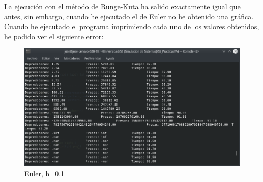 \documentclass[11pt,a4paper]{article}
\begin{document}
La ejecución con el método de Runge-Kuta ha salido exactamente igual que antes, sin embargo, cuando he ejecutado el de Euler no he obtenido una gráfica.
Cuando he ejecutado el programa imprimiendo cada uno de los valores obtenidos, he podido ver el siguiente error:
\begin{figure}[H]
	\centering
	\includegraphics[scale=0.5]{img/5-e-90-500.png}
	\caption{Euler, h=0.1}
\end{figure}
\end{document}
